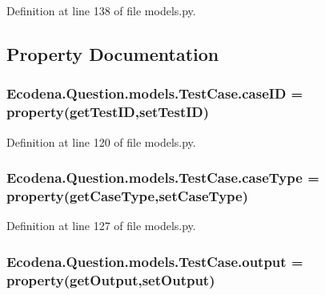 Definition at line 138 of file models.py.



\subsection{Property Documentation}
\hypertarget{class_ecodena_1_1_question_1_1models_1_1_test_case_a314e803077e1703cf4bfee0d0129ae70}{
\subsubsection[{caseID}]{\setlength{\rightskip}{0pt plus 5cm}Ecodena.Question.models.TestCase.caseID = property(getTestID,setTestID)}}
\label{d4/d96/class_ecodena_1_1_question_1_1models_1_1_test_case_a314e803077e1703cf4bfee0d0129ae70}


Definition at line 120 of file models.py.

\hypertarget{class_ecodena_1_1_question_1_1models_1_1_test_case_a4a653517a014a1ba0e7d9a9f34a2b90a}{
\subsubsection[{caseType}]{\setlength{\rightskip}{0pt plus 5cm}Ecodena.Question.models.TestCase.caseType = property(getCaseType,setCaseType)}}
\label{d4/d96/class_ecodena_1_1_question_1_1models_1_1_test_case_a4a653517a014a1ba0e7d9a9f34a2b90a}


Definition at line 127 of file models.py.

\hypertarget{class_ecodena_1_1_question_1_1models_1_1_test_case_ace441542b9d9129962df0d5a1b7d969e}{
\subsubsection[{output}]{\setlength{\rightskip}{0pt plus 5cm}Ecodena.Question.models.TestCase.output = property(getOutput,setOutput)}}
\label{d4/d96/class_ecodena_1_1_question_1_1models_1_1_test_case_ace441542b9d9129962df0d5a1b7d969e}


